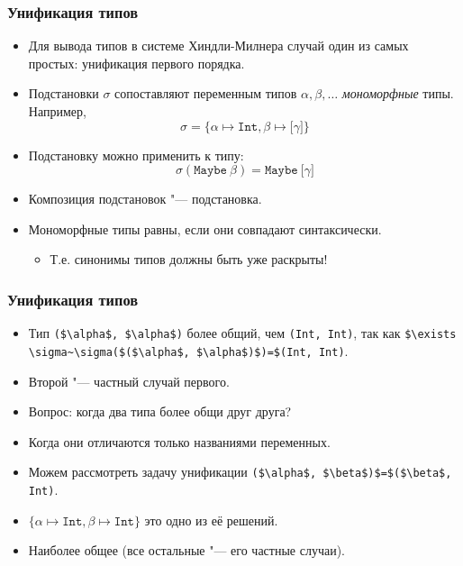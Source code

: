 \documentclass[11pt]{beamer}
\begin{document}
\begin{frame}[fragile]
\frametitle{Унификация типов}
\begin{itemize}
    \item Для вывода типов в системе Хиндли-Милнера случай один из самых простых: унификация первого порядка.
    \item Подстановки $\sigma$ сопоставляют переменным типов $\alpha, \beta, \ldots$ \emph{мономорфные} типы. Например,
    \[ \sigma=\{\alpha \mapsto \mathtt{Int}, \beta \mapsto \mathtt{[}\gamma\mathtt{]} \} \]
    \item Подстановку можно применить к типу:
    \[ \sigma(\mathtt{Maybe}~\beta)=\mathtt{Maybe}~\mathtt{[}\gamma\mathtt{]} \]
    \item Композиция подстановок "--- подстановка.
    \item Мономорфные типы равны, если они совпадают синтаксически. 
    \pause
    \begin{itemize}
        \item Т.е. синонимы типов должны быть уже раскрыты!
    \end{itemize}
\end{itemize}
\end{frame}

\begin{frame}[fragile]
\frametitle{Унификация типов}
\begin{itemize}
    \item Тип \lstinline[mathescape]|($\alpha$, $\alpha$)| более общий, чем \lstinline[mathescape]|(Int, Int)|, так как  \lstinline[mathescape]|$\exists \sigma~\sigma($($\alpha$, $\alpha$)$)=$(Int, Int)|.
    \item Второй "--- частный случай первого.
    \pause
    \item Вопрос: когда два типа более общи друг друга?
    \pause
    \item Когда они отличаются только названиями переменных.
    \pause
    \item Можем рассмотреть задачу унификации \lstinline[mathescape]|($\alpha$, $\beta$)$=$($\beta$, Int)|.
    \pause
    \item $\{ \alpha \mapsto \mathtt{Int}, \beta \mapsto \mathtt{Int} \}$ это одно из её решений.
    \pause
    \item Наиболее общее (все остальные "--- его частные случаи).
\end{itemize}
\end{frame}
\end{document}
